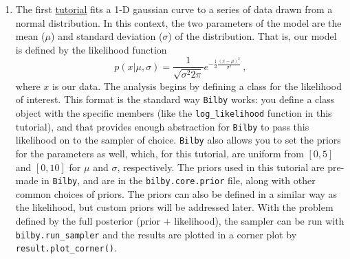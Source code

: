 \documentclass[
    aps,
    10pt,
    prd,
    notitlepage,
    onecolumn,s
    tightenlines,
    nofootinbib]{revtex4-1}
\newcommand{\software}[1]{\texttt{#1}}
\begin{document}
\begin{enumerate}
\item The first \href{https://git.ligo.org/lscsoft/bilby/-/blob/master/examples/core_examples/gaussian_example.py}{tutorial} fits a 1-D gaussian curve to a series of data drawn from a normal distribution. 
In this context, the two parameters of the model are the mean ($\mu$) and standard deviation ($\sigma$) of the distribution.
That is, our model is defined by the likelihood function
\begin{equation}
p( x | \mu, \sigma) = \frac{1}{\sqrt{\sigma^2 2 \pi}} e^{-\frac{1}{2} \frac{ (x - \mu)^2}{\sigma^2}}\,,
\end{equation}
where $x$ is our data.
The analysis begins by defining a class for the likelihood of interest. 
This format is the standard way \software{Bilby} works: you define a class object with the specific members (like the \software{log\_likelihood} function in this tutorial), and that provides enough abstraction for \software{Bilby} to pass this likelihood on to the sampler of choice.
\software{Bilby} also allows you to set the priors for the parameters as well, which, for this tutorial, are uniform from $[0,5]$ and $[0,10]$ for $\mu$ and $\sigma$, respectively.
The priors used in this tutorial are pre-made in \software{Bilby}, and are in the \software{bilby.core.prior} file, along with other common choices of priors.
The priors can also be defined in a similar way as the likelihood, but custom priors will be addressed later.
With the problem defined by the full posterior (prior + likelihood), the sampler can be run with \software{bilby.run\_sampler} and the results are plotted in a corner plot by \software{result.plot\_corner()}.


\end{enumerate}
\end{document}
